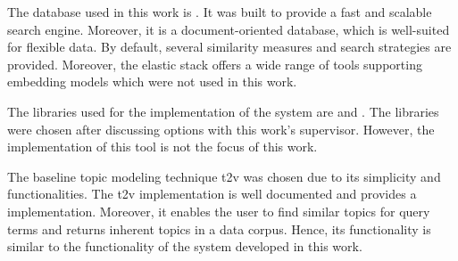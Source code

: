 The database used in this work is \databaseName{}.
It was built to provide a fast and scalable search engine.
Moreover, it is a document-oriented database, which is well-suited for flexible data.
By default, several similarity measures and search strategies are provided.
Moreover, the elastic stack offers a wide range of tools supporting embedding models which were not used in this work.


The libraries used for the implementation of the system are \angular{} and \flask{}.
The libraries were chosen after discussing options with this work's supervisor.
However, the implementation of this tool is not the focus of this work.

The baseline topic modeling technique \ac{t2v} was chosen due to its simplicity and functionalities.
The \ac{t2v} implementation is well documented and provides a \wordcloud{} implementation.
Moreover, it enables the user to find similar topics for query terms and returns inherent topics in a data corpus.
Hence, its functionality is similar to the functionality of the system developed in this work.